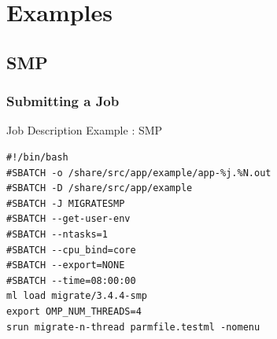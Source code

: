 \documentclass{beamer}
\begin{document}


\section{Examples}
\subsection{SMP}
\begin{frame}[fragile]
  \frametitle{Submitting a Job}
      \begin{block}{Job Description Example : SMP}
\begin{small}
\begin{verbatim}
#!/bin/bash
#SBATCH -o /share/src/app/example/app-%j.%N.out
#SBATCH -D /share/src/app/example
#SBATCH -J MIGRATESMP
#SBATCH --get-user-env
#SBATCH --ntasks=1
#SBATCH --cpu_bind=core
#SBATCH --export=NONE
#SBATCH --time=08:00:00
ml load migrate/3.4.4-smp
export OMP_NUM_THREADS=4
srun migrate-n-thread parmfile.testml -nomenu
\end{verbatim}
\end{small}
  \end{block}
\end{frame}
\end{document}
